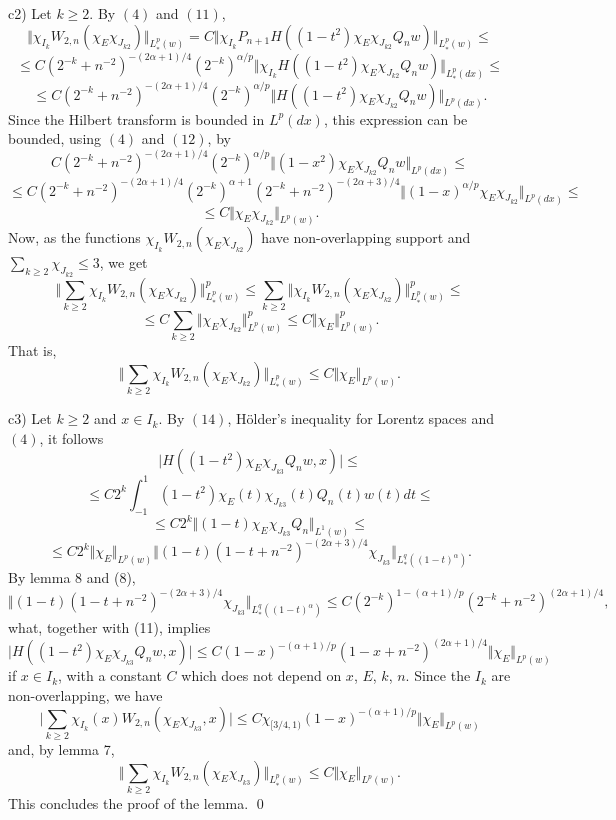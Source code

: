 c2) Let $k\geq 2$. By $(4)$ and $(11)$,
$$
   \Vert \chi_{I_k}W_{2,n}(\chi_E\chi_{J_{k2}}) \Vert_{L^p_*(w)} =
   C \Vert \chi_{I_k}P_{n+1}H((1-t^2)\chi_E\chi_{J_{k2}}Q_nw)
   \Vert_{L^p_*(w)} \leq
$$
$$
   \leq C (2^{-k}+n^{-2})^{-(2\alpha+1)/4}(2^{-k})^{\alpha/p} \Vert
   \chi_{I_k}H((1-t^2)\chi_E\chi_{J_{k2}}Q_nw) \Vert_{L^p_*(dx)} \leq
$$
$$
   \leq C (2^{-k}+n^{-2})^{-(2\alpha+1)/4}(2^{-k})^{\alpha/p}
   \Vert H((1-t^2)\chi_E\chi_{J_{k2}}Q_nw) \Vert_{L^p(dx)}.
$$
Since the Hilbert transform is bounded in $L^p(dx)$, this expression can be
bounded, using $(4)$ and $(12)$, by
$$
   C (2^{-k}+n^{-2})^{-(2\alpha+1)/4}(2^{-k})^{\alpha/p}
   \Vert (1-x^2)\chi_E\chi_{J_{k2}}Q_nw \Vert_{L^p(dx)} \leq
$$
$$
   \leq C
   (2^{-k}+n^{-2})^{-(2\alpha+1)/4}(2^{-k})^{\alpha+1}
   (2^{-k}+n^{-2})^{-(2\alpha+3)/4}
   \Vert (1-x)^{\alpha/p}\chi_E\chi_{J_{k2}} \Vert_{L^p(dx)} \leq
$$
$$
   \leq C \Vert \chi_E\chi_{J_{k2}} \Vert_{L^p(w)}.
$$
Now, as the functions $\chi_{I_k}W_{2,n}(\chi_E\chi_{J_{k2}})$ have
non-overlapping support and $\sum_{k\geq 2} \chi_{J_{k2}} \leq 3$, we get
$$
   \Vert \sum_{k\geq 2} \chi_{I_k}W_{2,n}(\chi_E\chi_{J_{k2}})
   \Vert ^p_{L^p_*(w)} \leq
   \sum_{k\geq 2} \Vert \chi_{I_k}W_{2,n}(\chi_E\chi_{J_{k2}})
   \Vert ^p_{L^p_*(w)} \leq
$$
$$
   \leq C \sum_{k\geq 2} \Vert \chi_E\chi_{J_{k2}} \Vert ^p_{L^p(w)}
   \leq C \Vert \chi_E \Vert ^p_{L^p(w)}.
$$
That is,
$$
   \Vert \sum_{k\geq 2} \chi_{I_k}W_{2,n}(\chi_E\chi_{J_{k2}})
   \Vert _{L^p_*(w)} \leq C \Vert \chi_E \Vert _{L^p(w)}.
$$

c3) Let $k\geq 2$ and $x \in I_k$. By $(14)$, H\"older's inequality for Lorentz
spaces and $(4)$, it follows
$$
   \vert H((1-t^2)\chi_E\chi_{J_{k3}}Q_nw,x) \vert \leq
$$
$$
   \leq C 2^k \int_{-1}^1(1-t^2)\chi_E(t)\chi_{J_{k3}}(t)Q_n(t)w(t)dt \leq
$$
$$
   \leq C 2^k \Vert (1-t)\chi_E\chi_{J_{k3}}Q_n \Vert _{L^1(w)} \leq
$$
$$
   \leq C 2^k \Vert \chi_E \Vert _{L^p(w)} \Vert
   (1-t)(1-t+n^{-2})^{-(2\alpha+3)/4} \chi_{J_{k3}}
   \Vert _{L^q_*((1-t)^{\alpha})}.
$$
By lemma 8 and (8),
$$
   \Vert (1-t)(1-t+n^{-2})^{-(2\alpha+3)/4} \chi_{J_{k3}} \Vert
   _{L^q_*((1-t)^{\alpha})} \leq C (2^{-k})^{1-(\alpha+1)/p}
   (2^{-k}+n^{-2})^{(2\alpha+1)/4},
$$
what, together with (11), implies
$$
   \vert H((1-t^2)\chi_E\chi_{J_{k3}}Q_nw,x) \vert \leq
   C (1-x)^{-(\alpha+1)/p} (1-x+n^{-2})^{(2\alpha+1)/4}
   \Vert \chi_E \Vert _{L^p(w)}
$$
if $x \in I_k$, with a constant $C$ which does not depend on $x$, $E$, $k$,
$n$. Since the $I_k$ are non-overlapping, we have
$$
   \vert \sum_{k\geq 2} \chi_{I_k}(x) W_{2,n}(\chi_E\chi_{J_{k3}},x) \vert
   \leq C \chi_{[3/4,1)} (1-x)^{-(\alpha+1)/p} \Vert \chi_E \Vert _{L^p(w)}
$$
and, by lemma 7,
$$
   \Vert \sum_{k\geq 2} \chi_{I_k} W_{2,n}(\chi_E\chi_{J_{k3}}) \Vert
   _{L^p_*(w)} \leq C \Vert \chi_E \Vert _{L^p(w)}.
$$
This concludes the proof of the lemma. \qed

